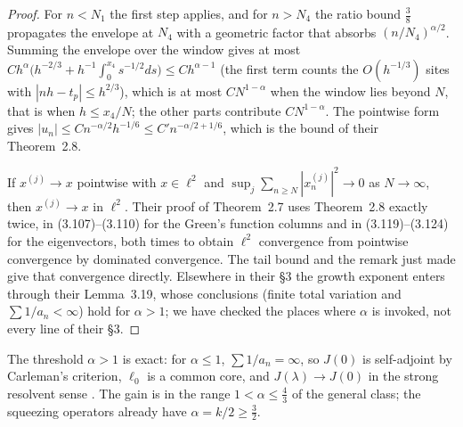 \begin{proof}
 For $n<N_1$ the first step applies, and for $n>N_4$ the ratio bound $\frac38$
propagates the envelope at $N_4$ with a geometric factor that absorbs $(n/N_4)^{\alpha/2}$.
Summing the envelope over the window gives at most
$Ch^\alpha\bigl(h^{-2/3}+h^{-1}\int_0^{x_4}s^{-1/2}ds\bigr)\le Ch^{\alpha-1}$ (the first term
counts the $O(h^{-1/3})$ sites with $|nh-t_p|\le h^{2/3}$), which is at most $CN^{1-\alpha}$
when the window lies beyond $N$, that is when $h\le x_4/N$; the other parts contribute
$CN^{1-\alpha}$. The pointwise form gives $|u_n|\le Cn^{-\alpha/2}h^{-1/6}\le C'n^{-\alpha/2+1/6}$, which is
the bound of their Theorem~2.8.

 If $x^{(j)}\to x$ pointwise with $x\in\ell^2$ and
$\sup_j\sum_{n\ge N}|x^{(j)}_n|^2\to0$ as $N\to\infty$, then $x^{(j)}\to x$ in $\ell^2$. Their proof of
Theorem~2.7 uses Theorem~2.8 exactly twice, in (3.107)--(3.110) for the Green's function
columns and in (3.119)--(3.124) for the eigenvectors, both times to obtain $\ell^2$ convergence
from pointwise convergence by dominated convergence. The tail bound and the remark just
made give that convergence directly. Elsewhere in their \S3 the growth exponent enters through
their Lemma~3.19, whose conclusions (finite total variation and $\sum1/a_n<\infty$) hold for $\alpha>1$;
we have checked the places where $\alpha$ is invoked, not every line of their \S3.
\end{proof}

The threshold $\alpha>1$ is exact: for $\alpha\le1$, $\sum1/a_n=\infty$, so $J(0)$ is self-adjoint by
Carleman's criterion, $\ell_0$ is a common core, and $J(\lambda)\to J(0)$ in the strong resolvent
sense \cite[Thm.~VIII.25]{ReedSimon1}. The gain is in the range $1<\alpha\le\frac43$ of the general
class; the squeezing operators already have $\alpha=k/2\ge\frac32$.
